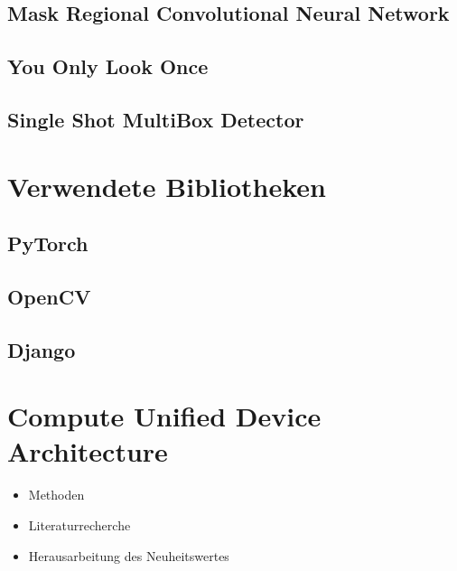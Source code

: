 \subsection{Mask Regional Convolutional Neural Network}

\subsection{You Only Look Once}

\subsection{Single Shot MultiBox Detector}


\section{Verwendete Bibliotheken}

\subsection{PyTorch}

\subsection{OpenCV}

\subsection{Django}


\section{Compute Unified Device Architecture}


\begin{itemize}
	\item Methoden
	\item Literaturrecherche
	\item Herausarbeitung des Neuheitswertes 
\end{itemize}

